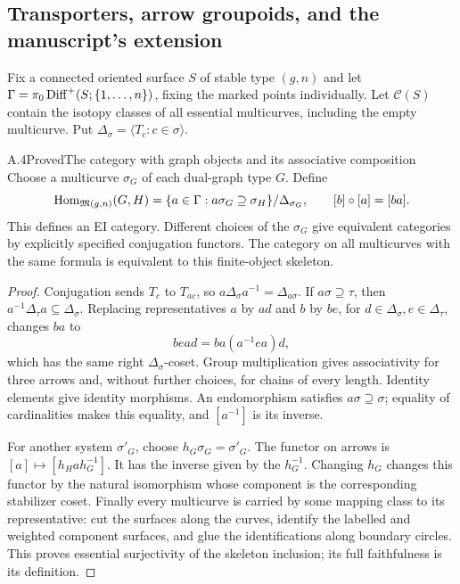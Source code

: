 \subsection{Transporters, arrow groupoids, and the manuscript's extension}

Fix a connected oriented surface $S$ of stable type $(g,n)$ and let $\Gamma=\pi_0\operatorname{Diff}^+(S;\{1,\ldots,n\})$, fixing the marked points individually. Let $\mathcal C(S)$ contain the isotopy classes of all essential multicurves, including the empty multicurve. Put $\Delta_\sigma=\langle T_c:c\in\sigma\rangle$.

\begin{result}{A.4}{Proved}{The category with graph objects and its associative composition}
Choose a multicurve $\sigma_G$ of each dual-graph type $G$. Define
\[
 \operatorname{Hom}_{\mathfrak M(g,n)}(G,H)
 =\{a\in\Gamma:a\sigma_G\supseteq\sigma_H\}/\Delta_{\sigma_G},
 \qquad [b]\circ[a]=[ba].
\]
This defines an EI category. Different choices of the $\sigma_G$ give equivalent categories by explicitly specified conjugation functors. The category on all multicurves with the same formula is equivalent to this finite-object skeleton.
\end{result}
\begin{proof}
Conjugation sends $T_c$ to $T_{ac}$, so $a\Delta_\sigma a^{-1}=\Delta_{a\sigma}$. If $a\sigma\supseteq\tau$, then $a^{-1}\Delta_\tau a\subseteq\Delta_\sigma$. Replacing representatives $a$ by $ad$ and $b$ by $be$, for $d\in\Delta_\sigma,e\in\Delta_\tau$, changes $ba$ to
\[
 be ad=ba(a^{-1}ea)d,
\]
which has the same right $\Delta_\sigma$-coset. Group multiplication gives associativity for three arrows and, without further choices, for chains of every length. Identity elements give identity morphisms. An endomorphism satisfies $a\sigma\supseteq\sigma$; equality of cardinalities makes this equality, and $[a^{-1}]$ is its inverse.

For another system $\sigma'_G$, choose $h_G\sigma_G=\sigma'_G$. The functor on arrows is $[a]\mapsto[h_Hah_G^{-1}]$. It has the inverse given by the $h_G^{-1}$. Changing $h_G$ changes this functor by the natural isomorphism whose component is the corresponding stabilizer coset. Finally every multicurve is carried by some mapping class to its representative: cut the surfaces along the curves, identify the labelled and weighted component surfaces, and glue the identifications along boundary circles. This proves essential surjectivity of the skeleton inclusion; its full faithfulness is its definition.
\end{proof}

